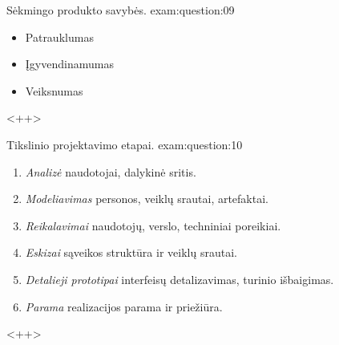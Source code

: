 \begin{question}{%
  Sėkmingo produkto savybės.
  }{exam:question:09}
  \begin{itemize}
    \item Patrauklumas
    \item Įgyvendinamumas
    \item Veiksnumas
  \end{itemize}
  <++>
\end{question}

\begin{question}{%
  Tikslinio projektavimo etapai.
  }{exam:question:10}
  \begin{enumerate}
    \item \emph{Analizė} naudotojai, dalykinė sritis.
    \item \emph{Modeliavimas} personos, veiklų srautai, artefaktai.
    \item \emph{Reikalavimai} naudotojų, verslo, techniniai poreikiai.
    \item \emph{Eskizai} sąveikos struktūra ir veiklų srautai.
    \item \emph{Detalieji prototipai} interfeisų detalizavimas, turinio išbaigimas.
    \item \emph{Parama} realizacijos parama ir priežiūra.
  \end{enumerate}
  <++>
\end{question}
